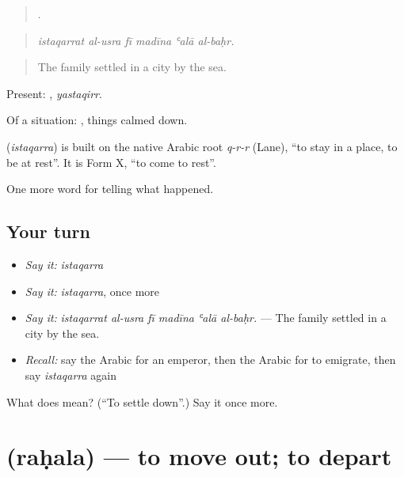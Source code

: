 \begin{quote}
     .
\end{quote}

\begin{quote}
\emph{istaqarrat al-usra fī madīna ʿalā al-baḥr.}
\end{quote}

\begin{quote}
The family settled in a city by the sea.
\end{quote}

Present: , \emph{yastaqirr}.

Of a situation:  , things calmed down.

\begin{cousinweb}
\textbf{} (\emph{istaqarra}) is built on the native Arabic root \emph{q-r-r} (Lane), \textquotedblleft{}to stay in a place, to be at rest\textquotedblright{}. It is Form X, \textquotedblleft{}to come to rest\textquotedblright{}.
\end{cousinweb}

\begin{grammarlens}[title={What you've built}]
One more word for telling what happened.
\end{grammarlens}

\subsection*{Your turn}
\begin{itemize}
\raggedright
  \item \emph{Say it:} \emph{istaqarra}
  \item \emph{Say it:} \emph{istaqarra}, once more
  \item \emph{Say it:} \emph{istaqarrat al-usra fī madīna ʿalā al-baḥr.} — The family settled in a city by the sea.
  \item \emph{Recall:} say the Arabic for an emperor, then the Arabic for to emigrate, then say \emph{istaqarra} again
\end{itemize}

\begin{tcolorbox}[breakable,colback=teal!4,colframe=teal!35!black,title={Before you move on}]
What does  mean? (\textquotedblleft{}To settle down\textquotedblright{}.) Say it once more.
\end{tcolorbox}
\section[\texorpdfstring{\ar{رحل} (raḥala)}{رحل (raḥala)}]{ (raḥala) — to move out; to depart}

